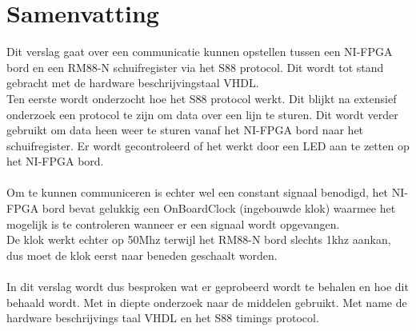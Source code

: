\chapter*{Samenvatting}
Dit verslag gaat over een communicatie kunnen opstellen tussen een NI-FPGA bord en een RM88-N schuifregister via het S88 protocol. Dit wordt tot stand gebracht met de hardware beschrijvingstaal VHDL.\\
Ten eerste wordt onderzocht hoe het S88 protocol werkt. Dit blijkt na extensief onderzoek een protocol te zijn om data over een lijn te sturen. Dit wordt verder gebruikt om data heen weer te sturen vanaf het NI-FPGA bord naar het schuifregister. Er wordt gecontroleerd of het werkt door een LED aan te zetten op het NI-FPGA bord.\\\\

Om te kunnen communiceren is echter wel een constant signaal benodigd, het NI-FPGA bord bevat gelukkig een OnBoardClock (ingebouwde klok) waarmee het mogelijk is te controleren wanneer er een signaal wordt opgevangen.\\
De klok werkt echter op 50Mhz terwijl het RM88-N bord slechts 1khz aankan, dus moet de klok eerst naar beneden geschaalt worden.\\\\

In dit verslag wordt dus besproken wat er geprobeerd wordt te behalen en hoe dit behaald wordt. Met in diepte onderzoek naar de middelen gebruikt. Met name de hardware beschrijvings taal VHDL en het S88 timings protocol.